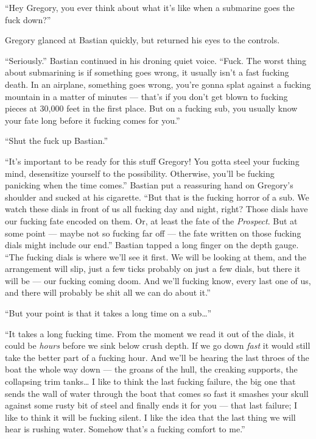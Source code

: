 \documentclass[
]{scrbook}
\begin{document}
``Hey Gregory, you ever think about what it's like when a submarine goes
the fuck down?''

Gregory glanced at Bastian quickly, but returned his eyes to the
controls.

``Seriously.'' Bastian continued in his droning quiet voice. ``Fuck. The
worst thing about submarining is if something goes wrong, it usually
isn't a fast fucking death. In an airplane, something goes wrong, you're
gonna splat against a fucking mountain in a matter of minutes --- that's
if you don't get blown to fucking pieces at 30,000 feet in the first
place. But on a fucking sub, you usually know your fate long before it
fucking comes for you.''

``Shut the fuck up Bastian.''

``It's important to be ready for this stuff Gregory! You gotta steel
your fucking mind, desensitize yourself to the possibility. Otherwise,
you'll be fucking panicking when the time comes.'' Bastian put a
reassuring hand on Gregory's shoulder and sucked at his cigarette. ``But
that is the fucking horror of a sub. We watch these dials in front of us
all fucking day and night, right? Those dials have our fucking fate
encoded on them. Or, at least the fate of the \emph{Prospect}. But at
some point --- maybe not so fucking far off --- the fate written on
those fucking dials might include our end.'' Bastian tapped a long
finger on the depth gauge. ``The fucking dials is where we'll see it
first. We will be looking at them, and the arrangement will slip, just a
few ticks probably on just a few dials, but there it will be --- our
fucking coming doom. And we'll fucking know, every last one of us, and
there will probably be shit all we can do about it.''

``But your point is that it takes a long time on a sub\ldots{}''

``It takes a long fucking time. From the moment we read it out of the
dials, it could be \emph{hours} before we sink below crush depth. If we
go down \emph{fast} it would still take the better part of a fucking
hour. And we'll be hearing the last throes of the boat the whole way
down --- the groans of the hull, the creaking supports, the collapsing
trim tanks\ldots{} I like to think the last fucking failure, the big one
that sends the wall of water through the boat that comes so fast it
smashes your skull against some rusty bit of steel and finally ends it
for you --- that last failure; I like to think it will be fucking
silent. I like the idea that the last thing we will hear is rushing
water. Somehow that's a fucking comfort to me.''
\end{document}
